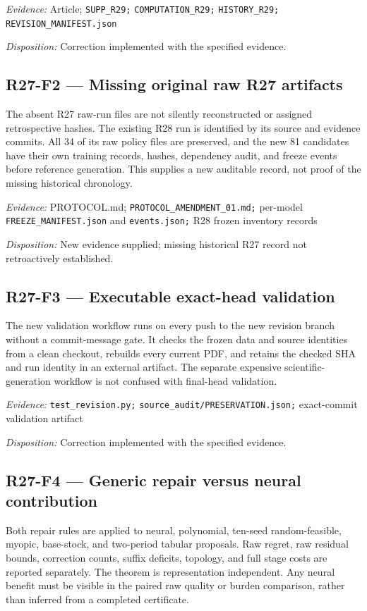 \emph{Evidence:} Article; \nolinkurl{SUPP_R29;} \nolinkurl{COMPUTATION_R29;} \nolinkurl{HISTORY_R29;} \nolinkurl{REVISION_MANIFEST.json}

\emph{Disposition:} Correction implemented with the specified evidence.
\subsection{R27-F2 --- Missing original raw R27 artifacts}
The absent R27 raw-run files are not silently reconstructed or assigned retrospective hashes. The existing R28 run is identified by its source and evidence commits. All 34 of its raw policy files are preserved, and the new 81 candidates have their own training records, hashes, dependency audit, and freeze events before reference generation. This supplies a new auditable record, not proof of the missing historical chronology.

\emph{Evidence:} PROTOCOL.md; \nolinkurl{PROTOCOL_AMENDMENT_01.md;} per-model \nolinkurl{FREEZE_MANIFEST.json} and \nolinkurl{events.json;} R28 frozen inventory records

\emph{Disposition:} New evidence supplied; missing historical R27 record not retroactively established.
\subsection{R27-F3 --- Executable exact-head validation}
The new validation workflow runs on every push to the new revision branch without a commit-message gate. It checks the frozen data and source identities from a clean checkout, rebuilds every current PDF, and retains the checked SHA and run identity in an external artifact. The separate expensive scientific-generation workflow is not confused with final-head validation.

\emph{Evidence:} \nolinkurl{test_revision.py;} \nolinkurl{source_audit/PRESERVATION.json;} exact-commit validation artifact

\emph{Disposition:} Correction implemented with the specified evidence.
\subsection{R27-F4 --- Generic repair versus neural contribution}
Both repair rules are applied to neural, polynomial, ten-seed random-feasible, myopic, base-stock, and two-period tabular proposals. Raw regret, raw residual bounds, correction counts, suffix deficits, topology, and full stage costs are reported separately. The theorem is representation independent. Any neural benefit must be visible in the paired raw quality or burden comparison, rather than inferred from a completed certificate.

